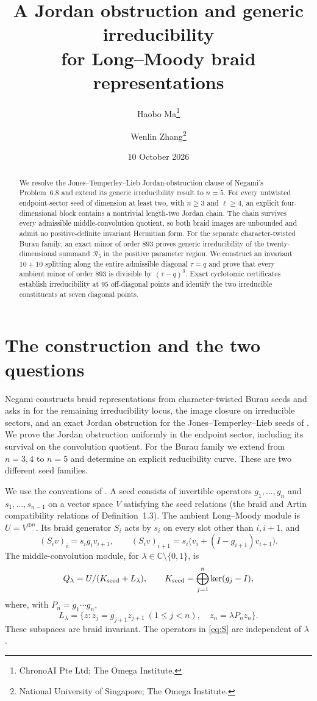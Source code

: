 \documentclass[11pt,a4paper]{article}
\title{A Jordan obstruction and generic irreducibility\\
for Long--Moody braid representations}
\author{Haobo Ma\thanks{ChronoAI Pte Ltd; The Omega Institute.}
\and Wenlin Zhang\thanks{National University of Singapore; The Omega Institute.}}
\date{10 October 2026}
\newcommand{\C}{\mathbb C}
\newcommand{\Rcal}{\mathcal R}
\begin{document}
\maketitle
\begin{abstract}
We resolve the Jones--Temperley--Lieb Jordan-obstruction clause of
Negami's Problem~6.8 and extend its generic irreducibility result to
$n=5$. For every untwisted endpoint-sector seed of dimension at least
two, with $n\ge3$ and $\ell\ge4$, an explicit four-dimensional block
contains a nontrivial length-two Jordan chain. The chain survives every
admissible middle-convolution quotient, so both braid images are
unbounded and admit no positive-definite invariant Hermitian form.
For the separate character-twisted Burau family, an exact minor of order
$893$ proves generic irreducibility of the twenty-dimensional summand
$\Rcal_5$ in the positive parameter region. We construct an invariant
$10+10$ splitting along the entire admissible diagonal $\tau=q$ and
prove that every ambient minor of order $893$ is divisible by
$(\tau-q)^3$. Exact cyclotomic certificates establish irreducibility at
$95$ off-diagonal points and identify the two irreducible constituents
at seven diagonal points.
\end{abstract}

\section{The construction and the two questions}

Negami constructs braid representations from character-twisted Burau
seeds and asks in \cite[Problem~6.8]{Negami} for the remaining
irreducibility locus, the image closure on irreducible sectors, and
an exact Jordan obstruction for the Jones--Temperley--Lieb seeds of
\cite[Remark~6.7(b)]{Negami}. We prove the Jordan obstruction uniformly
in the endpoint sector, including its survival on the convolution
quotient. For the Burau family we extend
\cite[Proposition~5.10]{Negami} from $n=3,4$ to $n=5$ and determine an
explicit reducibility curve. These are two different seed families.

We use the conventions of \cite[Definition~1.3 and Definitions~1.4--1.7]{Negami}.
A seed consists of invertible operators $g_1,\ldots,g_n$ and
$s_1,\ldots,s_{n-1}$ on a vector space $V$ satisfying the seed
relations (the braid and Artin compatibility relations of Definition~1.3).
The ambient
Long--Moody module is $U=V^{\oplus n}$. Its braid generator $S_i$
acts by $s_i$ on every slot other than $i,i+1$, and
\begin{equation}\label{eq:S}
 (S_iv)_i=s_ig_iv_{i+1},\qquad
 (S_iv)_{i+1}=s_i\bigl(v_i+(I-g_{i+1})v_{i+1}\bigr).
\end{equation}
The middle-convolution module, for $\lambda\in\C\setminus\{0,1\}$, is
\[
 Q_\lambda=U/(K_{\rm seed}+L_\lambda),\qquad
 K_{\rm seed}=\bigoplus_{j=1}^n\ker(g_j-I),
\]
where, with $P_n=g_1\cdots g_n$,
\begin{equation}\label{eq:L}
 L_\lambda=\{z:z_j=g_{j+1}z_{j+1}\ (1\le j<n),\quad
                    z_n=\lambda P_nz_n\}.
\end{equation}
These subspaces are braid invariant. The operators in \eqref{eq:S}
are independent of $\lambda$ \cite[Proposition~2.3]{Negami}.
\end{document}
